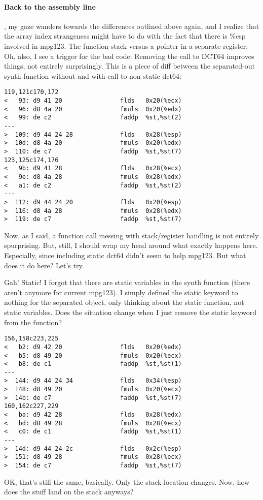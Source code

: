 \documentclass[a4paper,12pt]{scrartcl}
\begin{document}
\paragraph{Back to the assembly line},
my gaze wanders towards the differences outlined above again, and I realize that the array index strangeness might have to do with the fact that there is \%esp involved in mpg123. 
The function stack versus a pointer in a separate register.
Oh, also, I see a trigger for the bad code: Removing the call to DCT64 improves things, not entirely surprisingly.
This is a piece of diff between the separated-out synth function without and with call to non-static dct64:
\begin{verbatim}
119,121c170,172
<   93: d9 41 20                flds   0x20(%ecx)
<   96: d8 4a 20                fmuls  0x20(%edx)
<   99: de c2                   faddp  %st,%st(2)
---
>  109: d9 44 24 28             flds   0x28(%esp)
>  10d: d8 4a 20                fmuls  0x20(%edx)
>  110: de c7                   faddp  %st,%st(7)
123,125c174,176
<   9b: d9 41 28                flds   0x28(%ecx)
<   9e: d8 4a 28                fmuls  0x28(%edx)
<   a1: de c2                   faddp  %st,%st(2)
---
>  112: d9 44 24 20             flds   0x20(%esp)
>  116: d8 4a 28                fmuls  0x28(%edx)
>  119: de c7                   faddp  %st,%st(7)
\end{verbatim}
Now, as I said, a function call messing with stack/register handling is not entirely spurprising.
But, still, I should wrap my head around what exactly happens here.
Especially, since including static dct64 didn't seem to help mpg123. But what does it do here? Let's try.

Gah! Static! I forgot that there are static variables in the synth function (there aren't anymore for current mpg123). I simply defined the static keyword to nothing for the separated object, only thinking about the static function, not static variables.
Does the situation change when I just remove the static keyword from the function?
\begin{verbatim}
156,158c223,225
<   b2: d9 42 20                flds   0x20(%edx)
<   b5: d8 49 20                fmuls  0x20(%ecx)
<   b8: de c1                   faddp  %st,%st(1)
---
>  144: d9 44 24 34             flds   0x34(%esp)
>  148: d8 49 20                fmuls  0x20(%ecx)
>  14b: de c7                   faddp  %st,%st(7)
160,162c227,229
<   ba: d9 42 28                flds   0x28(%edx)
<   bd: d8 49 28                fmuls  0x28(%ecx)
<   c0: de c1                   faddp  %st,%st(1)
---
>  14d: d9 44 24 2c             flds   0x2c(%esp)
>  151: d8 49 28                fmuls  0x28(%ecx)
>  154: de c7                   faddp  %st,%st(7)
\end{verbatim}
OK, that's still the same, basically. Only the stack location changes.
Now, how does the stuff land on the stack anyways?
\end{document}
